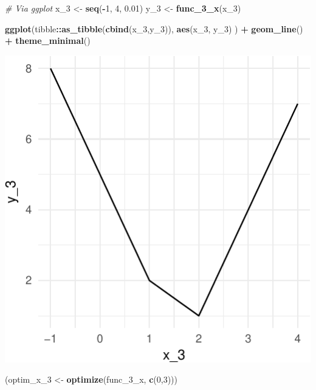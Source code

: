 \documentclass[11pt,]{article}
\newenvironment{Shaded}{\begin{snugshade}}{\end{snugshade}}
\newcommand{\KeywordTok}[1]{\textcolor[rgb]{0.13,0.29,0.53}{\textbf{#1}}}
\newcommand{\DecValTok}[1]{\textcolor[rgb]{0.00,0.00,0.81}{#1}}
\newcommand{\FloatTok}[1]{\textcolor[rgb]{0.00,0.00,0.81}{#1}}
\newcommand{\StringTok}[1]{\textcolor[rgb]{0.31,0.60,0.02}{#1}}
\newcommand{\CommentTok}[1]{\textcolor[rgb]{0.56,0.35,0.01}{\textit{#1}}}
\newcommand{\OperatorTok}[1]{\textcolor[rgb]{0.81,0.36,0.00}{\textbf{#1}}}
\newcommand{\NormalTok}[1]{#1}
\begin{document}
\begin{Shaded}
\begin{Highlighting}[]
\CommentTok{# Via ggplot}
\NormalTok{x_}\DecValTok{3}\NormalTok{ <-}\StringTok{ }\KeywordTok{seq}\NormalTok{(}\OperatorTok{-}\DecValTok{1}\NormalTok{, }\DecValTok{4}\NormalTok{, }\FloatTok{0.01}\NormalTok{)}
\NormalTok{y_}\DecValTok{3}\NormalTok{ <-}\StringTok{ }\KeywordTok{func_3_x}\NormalTok{(x_}\DecValTok{3}\NormalTok{)}

\KeywordTok{ggplot}\NormalTok{(tibble}\OperatorTok{::}\KeywordTok{as_tibble}\NormalTok{(}\KeywordTok{cbind}\NormalTok{(x_}\DecValTok{3}\NormalTok{,y_}\DecValTok{3}\NormalTok{)),}
       \KeywordTok{aes}\NormalTok{(x_}\DecValTok{3}\NormalTok{, y_}\DecValTok{3}\NormalTok{)}
\NormalTok{       ) }\OperatorTok{+}\StringTok{ }
\StringTok{  }\KeywordTok{geom_line}\NormalTok{() }\OperatorTok{+}
\StringTok{  }\KeywordTok{theme_minimal}\NormalTok{()}
\end{Highlighting}
\end{Shaded}

\begin{center}\includegraphics{Optimization_files/figure-latex/optimize_non_diff-2} \end{center}

\begin{Shaded}
\begin{Highlighting}[]
\NormalTok{(optim_x_}\DecValTok{3}\NormalTok{ <-}\StringTok{ }\KeywordTok{optimize}\NormalTok{(func_3_x, }\KeywordTok{c}\NormalTok{(}\DecValTok{0}\NormalTok{,}\DecValTok{3}\NormalTok{)))}
\end{Highlighting}
\end{Shaded}
\end{document}
